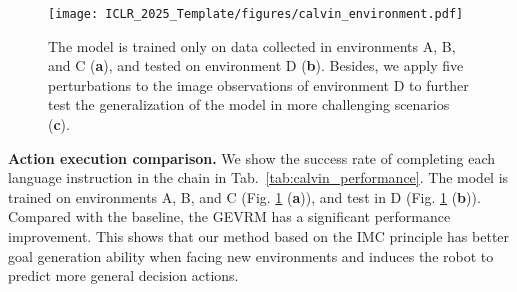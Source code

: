 \begin{figure}[tbp]
\vspace{-2em}
\centering
\texttt{[image: ICLR\_2025\_Template/figures/calvin\_environment.pdf]}
\caption{
The model is trained only on data collected in environments A, B, and C (\textbf{a}), and tested on environment D (\textbf{b}). 
Besides, we apply five perturbations to the image observations of environment D to further test the generalization of the model in more challenging scenarios (\textbf{c}).
} 
  \label{fig:calvinTask}
  \vspace{-1em}
\end{figure}

\textbf{Action execution comparison.}
We show the success rate of completing each language instruction in the chain in Tab.~\ref{tab:calvin_performance}. 
The model is trained on environments A, B, and C (Fig. \ref{fig:calvinTask} (\textbf{a})), and test in D (Fig. \ref{fig:calvinTask} (\textbf{b})).
Compared with the baseline, the GEVRM has a significant performance improvement. This shows that our method based on the IMC principle has better goal generation ability when facing new environments and induces the robot to predict more general decision actions.



